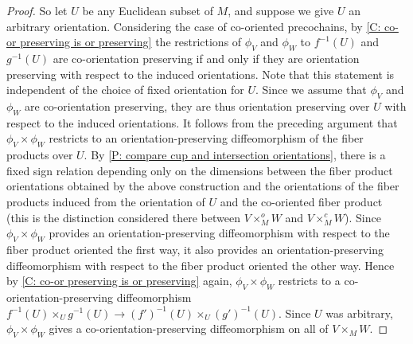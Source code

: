 \begin{proof}
	So let $U$ be any Euclidean subset of $M$, and suppose we give $U$ an arbitrary orientation.
	Considering the case of co-oriented precochains, by \cref{C: co-or preserving is or preserving} the restrictions of $\phi_V$ and $\phi_W$ to $f^{-1}(U)$ and $g^{-1}(U)$ are co-orientation preserving if and only if they are orientation preserving with respect to the induced orientations.
	Note that this statement is independent of the choice of fixed orientation for $U$.
	Since we assume that $\phi_V$ and $\phi_W$ are co-orientation preserving, they are thus orientation preserving over $U$ with respect to the induced orientations.
	It follows from the preceding argument that $\phi_V \times \phi_W$ restricts to an orientation-preserving diffeomorphism of the fiber products over $U$.
	By \cref{P: compare cup and intersection orientations}, there is a fixed sign relation depending only on the dimensions between the fiber product orientations obtained by the above construction and the orientations of the fiber products induced from the orientation of $U$ and the co-oriented fiber product (this is the distinction considered there between $V \times^o_M W$ and $V \times^c_M W$).
	Since $\phi_V \times \phi_W$ provides an orientation-preserving diffeomorphism with respect to the fiber product oriented the first way, it also provides an orientation-preserving diffeomorphism with respect to the fiber product oriented the other way.
	Hence by \cref{C: co-or preserving is or preserving} again, $\phi_V \times \phi_W$ restricts to a co-orientation-preserving diffeomorphism $f^{-1}(U) \times_U g^{-1}(U) \to (f')^{-1}(U) \times_U (g')^{-1}(U)$.
	Since $U$ was arbitrary, $\phi_V \times \phi_W$ gives a co-orientation-preserving diffeomorphism on all of $V \times_M W$.


\end{proof}
